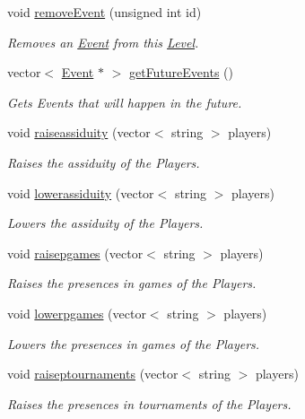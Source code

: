 \begin{DoxyCompactItemize}
void \hyperlink{class_level_a8f38f4c5bc05c7c7c4d4ea1321d91b84}{remove\+Event} (unsigned int id)
\begin{DoxyCompactList}\small\item\em Removes an \hyperlink{class_event}{Event} from this \hyperlink{class_level}{Level}. \end{DoxyCompactList}\item 
vector$<$ \hyperlink{class_event}{Event} $\ast$ $>$ \hyperlink{class_level_a2c4cb023c042409bd7551a91f369a990}{get\+Future\+Events} ()
\begin{DoxyCompactList}\small\item\em Gets Events that will happen in the future. \end{DoxyCompactList}\item 
void \hyperlink{class_level_ac7ecbf06c831f2a02cad567bcfb52ec9}{raiseassiduity} (vector$<$ string $>$ players)
\begin{DoxyCompactList}\small\item\em Raises the assiduity of the Players. \end{DoxyCompactList}\item 
void \hyperlink{class_level_ab4e4b8c386063fd8244042f7eefa3427}{lowerassiduity} (vector$<$ string $>$ players)
\begin{DoxyCompactList}\small\item\em Lowers the assiduity of the Players. \end{DoxyCompactList}\item 
void \hyperlink{class_level_a2d64a6f446a4d6c7c4959c7bc0972a84}{raisepgames} (vector$<$ string $>$ players)
\begin{DoxyCompactList}\small\item\em Raises the presences in games of the Players. \end{DoxyCompactList}\item 
void \hyperlink{class_level_a336a54c2ef7e4307e9353a200a11537e}{lowerpgames} (vector$<$ string $>$ players)
\begin{DoxyCompactList}\small\item\em Lowers the presences in games of the Players. \end{DoxyCompactList}\item 
void \hyperlink{class_level_ac592cc97524f49de9114f4af20312aad}{raiseptournaments} (vector$<$ string $>$ players)
\begin{DoxyCompactList}\small\item\em Raises the presences in tournaments of the Players. \end{DoxyCompactList}\item 

\end{DoxyCompactItemize}
